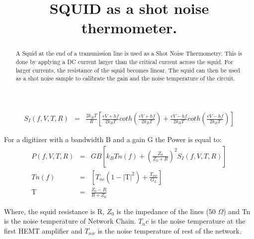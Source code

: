 \documentclass[10pt,a4paper]{article}
\begin{document}
\title{SQUID as a shot noise thermometer.}
\maketitle

\begin{abstract}
A Squid at the end of a transmission line is used as a Shot Noise Thermometry.
This is done by applying a DC current larger than the critical current  across the squid.
For larger currents, the resistance of the squid becomes linear.
The squid can then be used as a shot noise sample to calibrate the gain and the noise temperature 
of the circuit.
\end{abstract}

\begin{eqnarray}
S_I (f, V, T, R) &=&  \frac{2k_BT}{R}  
\left[
\frac{eV + hf}{2k_BT} 
coth \left( \frac{eV + hf}{2k_BT} \right) +
\frac{eV - hf}{2k_BT} 
coth \left( \frac{eV - hf}{2k_BT} \right) 
\right]
\end{eqnarray}

For a digitizer with a bandwidth B and a gain G the Power is equal to:
\begin{eqnarray}
P(f, V, T, R) &=& G B 
\left[ 
k_B Tn(f) + 
\left(
\frac{Z_0}{Z_0 + R}
\right)^2
S_I(f, V, T, R)
\right] \\
%
Tn(f) &=&
\left[ T_{nc} (1- | \mathrm{T} |^2) + \frac{T_{nw}}{G_L}
\right]\\
%
\mathrm{T} &=& \frac{Z_0-R}{R+Z_0}
\end{eqnarray}

Where, the squid resistance is R, $Z_0$ is the impedance of the lines (50 $\Omega$) and
Tn is the noise temperature of Network Chain.
$T_nc$ is the noise temperature at the first HEMT amplifier and $T_{nw}$ is the noise temperature of rest of the network.
\end{document}
